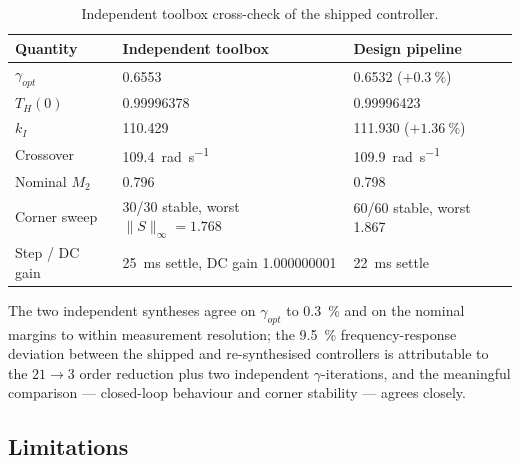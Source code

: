 \begin{table}[H]
\caption{Independent toolbox cross-check of the shipped controller.}
\label{tab:matlab}
\begin{tabular}{lll}
\toprule
\textbf{Quantity} & \textbf{Independent toolbox} & \textbf{Design pipeline}\\
\midrule
$\gamma_{opt}$              & \num{0.6553}      & \num{0.6532} ($+\SI{0.3}{\percent}$)\\
$T_H(0)$                    & \num{0.99996378}  & \num{0.99996423}\\
$k_I$                       & \num{110.429}     & \num{111.930} ($+\SI{1.36}{\percent}$)\\
Crossover                   & \SI{109.4}{\radian\per\second} & \SI{109.9}{\radian\per\second}\\
Nominal $M_2$               & \num{0.796}       & \num{0.798}\\
Corner sweep                & 30/30 stable, worst $\|S\|_\infty=\num{1.768}$ & 60/60 stable, worst \num{1.867}\\
Step / DC gain              & \SI{25}{\milli\second} settle, DC gain \num{1.000000001} & \SI{22}{\milli\second} settle\\
\bottomrule
\end{tabular}
\end{table}

The two independent syntheses agree on $\gamma_{opt}$ to \SI{0.3}{\percent} and on the
nominal margins to within measurement resolution; the \SI{9.5}{\percent} frequency-response
deviation between the shipped and re-synthesised controllers is attributable to the
$21\to3$ order reduction plus two independent $\gamma$-iterations, and the meaningful
comparison --- closed-loop behaviour and corner stability --- agrees closely.

\subsection{Limitations}
\label{sec:share-limitations}

